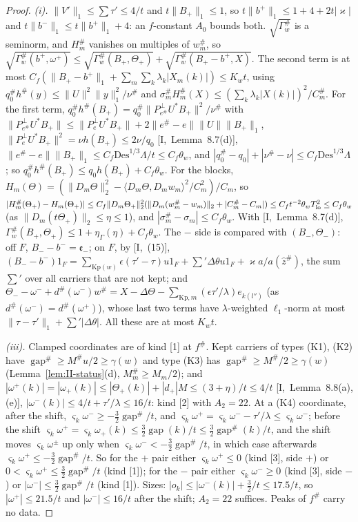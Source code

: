 \documentclass[10pt]{amsart}
\theoremstyle{definition}
\theoremstyle{remark}
\newcommand{\gap}{\operatorname{gap}}
\newcommand{\zh}{\hat z}
\newcommand{\ip}[2]{\langle #1,#2\rangle}
\begin{document}
\begin{proof}
\emph{(i).}  $\|V'\|_1\le\sum\tau'\le4/t$ and $t\|B_+\|_1\le1$, so
$t\|b^+\|_1\le1+4+2t|\varkappa|$ and $t\|b^-\|_1\le t\|b^+\|_1+4$: an
$f$-constant $A_0$ bounds both.  $\sqrt{\Gamma^\#_w}$ is a seminorm, and
$H^\#_m$ vanishes on multiples of $w^\#_m$, so
$\sqrt{\Gamma^\#_w(b^+,\omega^+)}\le\sqrt{\Gamma^\#_w(B_+,\Theta_+)}+
\sqrt{\Gamma^\#_w(B_+-b^+,X)}$.  The second term is at most $C_f(\|B_+-
b^+\|_1+\sum_m\sum_k\lambda_k|X_m(k)|)\le K_wt$, using $q^\#_0h^\#(y)\le
\|U\|^2\|y\|_1^2/\nu^\#$ and $\sigma^\#_mH^\#_m(X)\le(\sum_k\lambda_k|X(k)|)^2/
C^\#_m$.  For the first term, $q_0^\#h^\#(B_+)=q^\#_0\|P^\perp_{e^\#}U^*B_+\|^2/
\nu^\#$ with $\|P^\perp_{e^\#}U^*B_+\|\le\|P^\perp_eU^*B_+\|+2\|e^\#-e\|\|U\|
\|B_+\|_1$, $\|P^\perp_eU^*B_+\|^2=\nu h(B_+)\le2\nu/q_0$
[I,~Lemma~8.7(d)], $\|e^\#-e\|\|B_+\|_1\le C_f\mathrm{Des}^{1/3}\Lambda/t\le
C_f\theta_w$, and $|q^\#_0-q_0|+|\nu^\#-\nu|\le C_f\mathrm{Des}^{1/3}\Lambda$;
so $q^\#_0h^\#(B_+)\le q_0h(B_+)+C_f\theta_w$.  For the blocks,
$H_m(\Theta)=(\|D_m\Theta\|_2^2-\ip{D_m\Theta}{D_mw_m}^2/C_m^2)/C_m$, so
$|H^\#_m(\Theta_+)-H_m(\Theta_+)|\le C_f\|D_m\Theta_+\|_2^2(\|D_m(w^\#_m-w_m)\|_2
+|C^\#_m-C_m|)\le C_ft^{-2}\theta_wT_{\rm lo}^2\le C_f\theta_w$ (as
$\|D_m(t\Theta_+)\|_2\le\eta\le1$), and $|\sigma^\#_m-\sigma_m|\le C_f\theta_w$.
With [I,~Lemma~8.7(d)], $\Gamma^\#_w(B_+,\Theta_+)\le1+\eta_\Gamma(\eta)+
C_f\theta_w$.  The $-$ side is compared with $(B_-,\Theta_-)$: off $F$,
$B_--b^-=\mathfrak e_-$; on $F$, by [I,~(15)],
$(B_--b^-)1_F=\sum_{\mathrm{Kp}(w)}\epsilon(\tau'-\tau)u1_F+\sum'\Delta\theta
u1_F+\varkappa a/a(\zh^\#)$, the sum $\sum'$ over all carriers that are not
kept; and $\Theta_--\omega^-+d^\#(\omega^-)w^\#=X-\Delta\Theta-\sum_{\mathrm{Kp},
m}(\epsilon\tau'/\lambda)e_{k(l'')}$ (as $d^\#(\omega^-)=d^\#(\omega^+)$),
whose last two terms have $\lambda$-weighted $\ell_1$-norm at most
$\|\tau-\tau'\|_1+\sum'|\Delta\theta|$.  All these are at most $K_wt$.

\emph{(iii).}  Clamped coordinates are of kind [1] at $f^\#$.  Kept
carriers of types (K1), (K2) have $\gap^\#\ge M^\#u/2\ge\gamma(w)$ and type
(K3) has $\gap^\#\ge M^\#/2\ge\gamma(w)$ (Lemma~\ref{lem:II-status}(d),
$M^\#_m\ge M_m/2$); and $|\omega^+(k)|=|\omega_+(k)|\le|\Theta_+(k)|+|d_+|M\le
(3+\eta)/t\le4/t$ [I,~Lemma~8.8(a),(e)], $|\omega^-(k)|\le4/t+\tau'/\lambda
\le16/t$: kind [2] with $A_2=22$.  At a (K4) coordinate, after the shift,
$\varsigma_k\omega^-\ge-\frac32\gap^\#/t$, and $\varsigma_k\omega^+=
\varsigma_k\omega^--\tau'/\lambda\le\varsigma_k\omega^-$; before the shift
$\varsigma_k\omega^+=\varsigma_k\omega_+(k)\le\frac32\gap(k)/t\le\frac32
\gap^\#(k)/t$, and the shift moves $\varsigma_k\omega^\pm$ up only when
$\varsigma_k\omega^-<-\frac32\gap^\#/t$, in which case afterwards
$\varsigma_k\omega^+\le-\frac32\gap^\#/t$.  So for the $+$ pair either
$\varsigma_k\omega^+\le0$ (kind [3], side $+$) or $0<\varsigma_k\omega^+\le
\frac32\gap^\#/t$ (kind [1]); for the $-$ pair either $\varsigma_k\omega^-\ge0$
(kind [3], side $-$) or $|\omega^-|\le\frac32\gap^\#/t$ (kind [1]).  Sizes:
$|o_k|\le|\omega^-(k)|+\frac32/t\le17.5/t$, so $|\omega^+|\le21.5/t$ and
$|\omega^-|\le16/t$ after the shift; $A_2=22$ suffices.  Peaks of $f^\#$
carry no data.
\end{proof}
\end{document}
